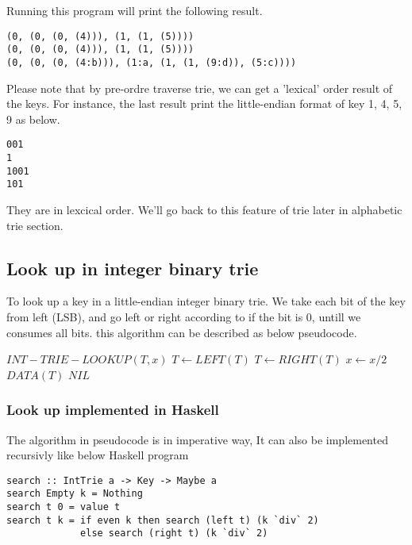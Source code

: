 \documentclass{article}
\begin{document}
Running this program will print the following result.

\begin{verbatim}
(0, (0, (0, (4))), (1, (1, (5))))
(0, (0, (0, (4))), (1, (1, (5))))
(0, (0, (0, (4:b))), (1:a, (1, (1, (9:d)), (5:c))))
\end{verbatim}

Please note that by pre-ordre traverse trie, we can get a 'lexical' order
result of the keys. For instance, the last result print the little-endian
format of key 1, 4, 5, 9 as below.

\begin{verbatim}
001
1
1001
101
\end{verbatim}

They are in lexcical order. We'll go back to this feature of trie later in 
alphabetic trie section.

\subsection{Look up in integer binary trie} 

To look up a key in a little-endian integer binary trie. We take each
bit of the key from left (LSB), and go left or right according to if
the bit is 0, untill we consumes all bits. this algorithm can be described
as below pseudocode.

\begin{algorithmic}
\STATE $INT-TRIE-LOOKUP(T, x)$
      \STATE $T \leftarrow LEFT(T)$
    \ELSE
      \STATE $T \leftarrow RIGHT(T)$
    \ENDIF
    \STATE $x \leftarrow x/2$
  \ENDWHILE
   \RETURN $DATA(T)$
  \ELSE \RETURN $NIL$ \ENDIF
\end{algorithmic}

\subsubsection*{Look up implemented in Haskell}
The algorithm in pseudocode is in imperative way, It can also be implemented 
recursivly like below Haskell program

\lstset{language=Haskell}
\begin{lstlisting}
search :: IntTrie a -> Key -> Maybe a
search Empty k = Nothing
search t 0 = value t
search t k = if even k then search (left t) (k `div` 2)
             else search (right t) (k `div` 2)
\end{lstlisting}
\end{document}
